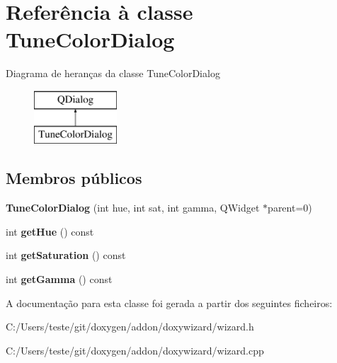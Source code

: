 \hypertarget{class_tune_color_dialog}{\section{Referência à classe Tune\-Color\-Dialog}
\label{class_tune_color_dialog}
}
Diagrama de heranças da classe Tune\-Color\-Dialog\begin{figure}[H]
\begin{center}
\leavevmode
\includegraphics[height=2.000000cm]{class_tune_color_dialog}
\end{center}
\end{figure}
\subsection*{Membros públicos}
\begin{DoxyCompactItemize}
\item 
\hypertarget{class_tune_color_dialog_a1d5f1f3a1cc2131883cbf8cc0257a24a}{{\bfseries Tune\-Color\-Dialog} (int hue, int sat, int gamma, Q\-Widget $\ast$parent=0)}\label{class_tune_color_dialog_a1d5f1f3a1cc2131883cbf8cc0257a24a}

\item 
\hypertarget{class_tune_color_dialog_a91e408797ecd2b277bc6f455278f5c7a}{int {\bfseries get\-Hue} () const }\label{class_tune_color_dialog_a91e408797ecd2b277bc6f455278f5c7a}

\item 
\hypertarget{class_tune_color_dialog_a1c3a119e7ebb0261bf92b4bb5302649c}{int {\bfseries get\-Saturation} () const }\label{class_tune_color_dialog_a1c3a119e7ebb0261bf92b4bb5302649c}

\item 
\hypertarget{class_tune_color_dialog_ac5b51928f8d7a64e3f04ecf48c94fc1e}{int {\bfseries get\-Gamma} () const }\label{class_tune_color_dialog_ac5b51928f8d7a64e3f04ecf48c94fc1e}

\end{DoxyCompactItemize}


A documentação para esta classe foi gerada a partir dos seguintes ficheiros\-:\begin{DoxyCompactItemize}
\item 
C\-:/\-Users/teste/git/doxygen/addon/doxywizard/wizard.\-h\item 
C\-:/\-Users/teste/git/doxygen/addon/doxywizard/wizard.\-cpp\end{DoxyCompactItemize}
